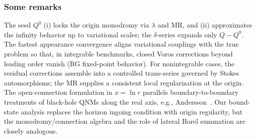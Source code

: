 \subsubsection{Some remarks}
The seed $Q^0$ (i) locks the origin monodromy via $\lambda$ and MR, and (ii) approximates the infinity behavior up to variational scales; the $\delta$-series expands only $Q-Q^0$.
The fastest appearance convergence aligns variational couplings with the true problem so that, in integrable benchmarks, closed Voros corrections beyond leading order vanish (RG fixed-point behavior).
For nonintegrable cases, the residual corrections assemble into a controlled trans-series governed by Stokes automorphisms; the MR supplies a consistent local regularization at the origin.
The open-connection formulation in $x=\ln r$ parallels boundary-to-boundary treatments of black-hole QNMs along the real axis, e.g., Andersson~\cite{Andersson:1995zk}.
Our bound-state analysis replaces the horizon ingoing condition with origin regularity, but the monodromy/connection algebra and the role of lateral Borel summation are closely
analogous.
